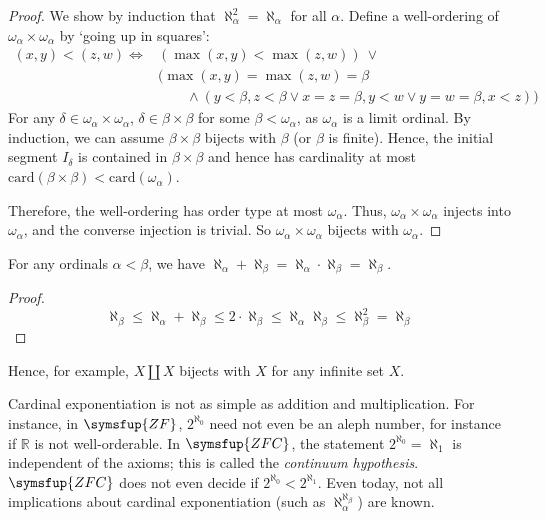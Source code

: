 \begin{proof}
    We show by induction that \( \aleph_\alpha^2 = \aleph_\alpha \) for all \( \alpha \).
    Define a well-ordering of \( \omega_\alpha \times \omega_\alpha \) by `going up in squares':
    \begin{align*}
        (x,y) < (z,w) \iff &(\max(x,y) < \max(z,w)) \ \vee \\
        &(\max(x,y) = \max(z,w) = \beta \\
        &\quad\quad\wedge (y < \beta, z < \beta \vee x = z = \beta, y < w \vee y = w = \beta, x < z))
    \end{align*}
    For any \( \delta \in \omega_\alpha \times \omega_\alpha \), \( \delta \in \beta \times \beta \) for some \( \beta < \omega_\alpha \), as \( \omega_\alpha \) is a limit ordinal.
    By induction, we can assume \( \beta \times \beta \) bijects with \( \beta \) (or \( \beta \) is finite).
    Hence, the initial segment \( I_\delta \) is contained in \( \beta \times \beta \) and hence has cardinality at most \( \mathrm{card}(\beta \times \beta) < \mathrm{card}(\omega_\alpha) \).

    Therefore, the well-ordering has order type at most \( \omega_\alpha \).
    Thus, \( \omega_\alpha \times \omega_\alpha \) injects into \( \omega_\alpha \), and the converse injection is trivial.
    So \( \omega_\alpha \times \omega_\alpha \) bijects with \( \omega_\alpha \).
\end{proof}
\begin{corollary}
    For any ordinals \( \alpha < \beta \), we have \( \aleph_\alpha + \aleph_\beta = \aleph_\alpha \cdot \aleph_\beta = \aleph_\beta \).
\end{corollary}
\begin{proof}
    \[ \aleph_\beta \leq \aleph_\alpha + \aleph_\beta \leq 2 \cdot \aleph_\beta \leq \aleph_\alpha \aleph_\beta \leq \aleph_\beta^2 = \aleph_\beta \]
\end{proof}
Hence, for example, \( X \amalg X \) bijects with \( X \) for any infinite set \( X \).

Cardinal exponentiation is not as simple as addition and multiplication.
For instance, in \( \symsfup{ZF} \), \( 2^{\aleph_0} \) need not even be an aleph number, for instance if \( \mathbb R \) is not well-orderable.
In \( \symsfup{ZFC} \), the statement \( 2^{\aleph_0} = \aleph_1 \) is independent of the axioms; this is called the \emph{continuum hypothesis}.
\( \symsfup{ZFC} \) does not even decide if \( 2^{\aleph_0} < 2^{\aleph_1} \).
Even today, not all implications about cardinal exponentiation (such as \( \aleph_\alpha^{\aleph_\beta} \)) are known.
